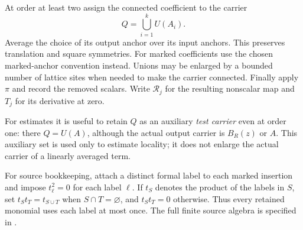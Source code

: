 At order at least two assign the connected coefficient to the carrier
\begin{equation}
 Q=\bigcup_{i=1}^k U(A_i).
 \label{rg:test-carrier}
\end{equation}
Average the choice of its output anchor over its input anchors.  This
preserves translation and square symmetries.  For marked coefficients
use the chosen marked-anchor convention instead.  Unions may be enlarged
by a bounded number of lattice sites when needed to make the carrier
connected.  Finally apply $\pi$ and record the removed scalars.  Write
$\mathcal R_j$ for the resulting nonscalar map and $T_j$ for its derivative
at zero.

For estimates it is useful to retain $Q$ as an auxiliary \emph{test
carrier} even at order one: there $Q=U(A)$, although the actual output
carrier is $B_R(z)$ or $A$.  This auxiliary set is used only to estimate
locality; it does not enlarge the actual carrier of a linearly averaged
term.

For source bookkeeping, attach a distinct formal label to each marked
insertion and impose $t_\ell^2=0$ for each label $\ell$. If $t_S$
denotes the product of the labels in $S$, set
$t_St_T=t_{S\cup T}$ when $S\cap T=\varnothing$, and $t_St_T=0$
otherwise. Thus every retained monomial uses each label at most once.
The full finite source algebra is specified in .

